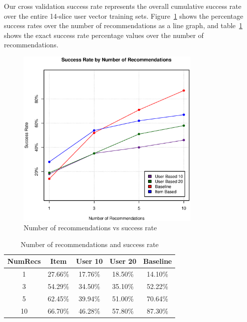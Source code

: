 \documentclass{article} %
\begin{document}
Our cross validation success rate represents the overall cumulative success rate over the entire 14-slice user vector training sets. Figure~\ref{fig:results} shows the percentage success rates over the number of recommendations as a line graph, and table~\ref{table:results} shows the exact success rate percentage values over the number of recommendations.

\begin{figure}[h]
\begin{center}
\includegraphics[width=0.8\textwidth]{graph}
\end{center}
\caption{Number of recommendations vs success rate}
\label{fig:results}
\end{figure}

\begin{table}[h]
   \centering
   \begin{tabular}{|c|c|c|c|c|}
      \hline
      NumRecs & Item & User 10 & User 20 & Baseline  \\
      \hline
      1 & 27.66\% & 17.76\%  & 18.50\% & 14.10\%\\
      3 & 54.29\% & 34.50\% & 35.10\% & 52.22\%\\
      5 & 62.45\% & 39.94\% & 51.00\% & 70.64\%\\
      10 & 66.70\% & 46.28\% & 57.80\% & 87.30\%\\
      \hline
   \end{tabular}
   \caption{Number of recommendations and success rate}
   \label{table:results}
\end{table}
\end{document}

